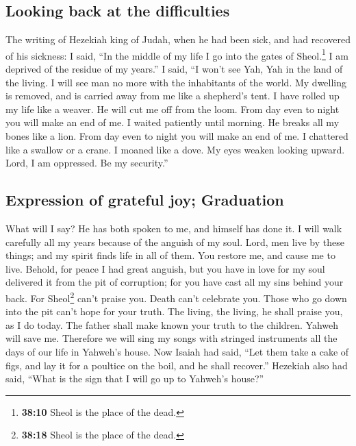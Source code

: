 \hypertarget{looking-back-at-the-difficulties}{%
\subsection{Looking back at the
difficulties}\label{looking-back-at-the-difficulties}}

 The writing of Hezekiah king of Judah, when he had been
sick, and had recovered of his sickness:  I said, ``In
the middle of my life I go into the gates of Sheol.\footnote{\textbf{38:10}
  Sheol is the place of the dead.} I am deprived of the residue of my
years.''  I said, ``I won't see Yah, Yah in the land of
the living. I will see man no more with the inhabitants of the world.
 My dwelling is removed, and is carried away from me like
a shepherd's tent. I have rolled up my life like a weaver. He will cut
me off from the loom. From day even to night you will make an end of me.
 I waited patiently until morning. He breaks all my bones
like a lion. From day even to night you will make an end of me.
 I chattered like a swallow or a crane. I moaned like a
dove. My eyes weaken looking upward. Lord, I am oppressed. Be my
security.''

\hypertarget{expression-of-grateful-joy-graduation}{%
\subsection{Expression of grateful joy;
Graduation}\label{expression-of-grateful-joy-graduation}}

 What will I say? He has both spoken to me, and himself
has done it. I will walk carefully all my years because of the anguish
of my soul.  Lord, men live by these things; and my
spirit finds life in all of them. You restore me, and cause me to live.
 Behold, for peace I had great anguish, but you have in
love for my soul delivered it from the pit of corruption; for you have
cast all my sins behind your back.  For Sheol\footnote{\textbf{38:18}
  Sheol is the place of the dead.} can't praise you. Death can't
celebrate you. Those who go down into the pit can't hope for your truth.
 The living, the living, he shall praise you, as I do
today. The father shall make known your truth to the children.
 Yahweh will save me. Therefore we will sing my songs
with stringed instruments all the days of our life in Yahweh's house.
 Now Isaiah had said, ``Let them take a cake of figs, and
lay it for a poultice on the boil, and he shall recover.''
 Hezekiah also had said, ``What is the sign that I will
go up to Yahweh's house?''

